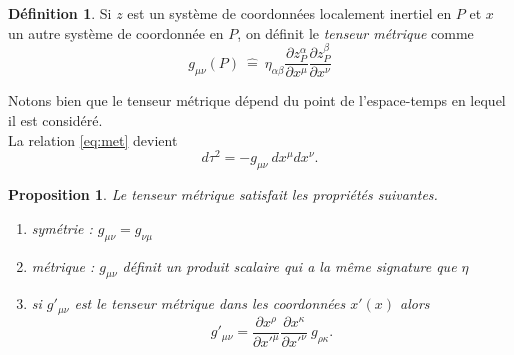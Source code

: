 \documentclass[a4paper,11pt]{report}
\theoremstyle{definition}
\theoremstyle{plain}
\newtheorem{prop}[thm]{Proposition}
\theoremstyle{definition}
\newtheorem{defn}{Définition}[chapter]
\theoremstyle{remark}
\newcommand{\p}{\partial}
\begin{document}
            \begin{defn}
                Si $z$ est un système de coordonnées localement inertiel en $P$ et $x$ un autre système de coordonnée en $P$, on définit le \textit{tenseur métrique} comme
                \begin{equation}
                    g_{\mu\nu}(P)~\hat{=}~\eta_{\alpha\beta}\frac{\p z^\alpha_P}{ \p x^\mu}\frac{\p z^\beta_P}{\p x^\nu}
                \end{equation}
            \end{defn}
            Notons bien que le tenseur métrique dépend du point de l'espace-temps en lequel il est considéré.\\
            La relation \ref{eq:met} devient
            \begin{equation}
                d\tau^2 = -g_{\mu\nu}~dx^\mu dx^\nu.
            \end{equation}
            
            \begin{prop}
                Le tenseur métrique satisfait les propriétés suivantes.
                \begin{enumerate}[label = \textit{\roman*)}]
                    \item symétrie : $g_{\mu\nu}=g_{\nu\mu}$
                    \item métrique : $g_{\mu\nu}$ définit un produit scalaire qui a la même signature que $\eta$
                    \item si $g'_{\mu\nu}$ est le tenseur métrique dans les coordonnées $x'(x)$ alors
                    \begin{equation}
                        g'_{\mu\nu} = \frac{\p x^\rho}{\p x'^\mu}\frac{\p x^\kappa}{\p x'^\nu}~g_{\rho\kappa}.
                    \end{equation}
                \end{enumerate}
            \end{prop}
            
\end{document}
